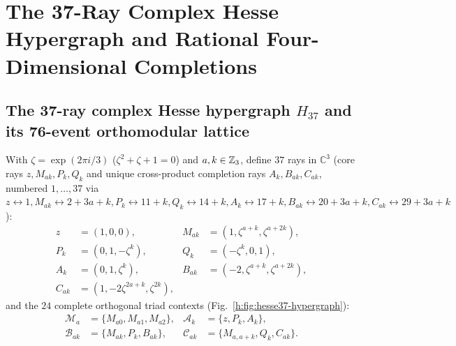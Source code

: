 \documentclass[aps,pra,reprint,superscriptaddress,longbibliography,nofootinbib,floatfix,10pt]{revtex4-2}
\theoremstyle{definition}\newtheorem{definition}[theorem]{Definition}
\theoremstyle{remark}\newtheorem{remark}[theorem]{Remark}
\newcommand{\C}{\mathbb C}\newcommand{\R}{\mathbb R}\newcommand{\Q}{\mathbb Q}
\begin{document}
\section{The 37-Ray Complex Hesse Hypergraph and Rational Four-Dimensional Completions}\label{sec:hesse}\label{sec:four-dimensional}

\subsection{The 37-ray complex Hesse hypergraph \texorpdfstring{$H_{37}$}{H37} and its 76-event orthomodular lattice}

With $\zeta=\exp(2\pi i/3)$ ($\zeta^2+\zeta+1=0$) and $a,k\in\mathbb Z_3$, define $37$ rays in $\C^3$ (core rays $z,M_{ak},P_k,Q_k$ and unique cross-product completion rays $A_k,B_{ak},C_{ak}$, numbered $1,\ldots,37$ via $z\leftrightarrow 1, M_{ak}\leftrightarrow 2+3a+k, P_k\leftrightarrow 11+k, Q_k\leftrightarrow 14+k, A_k\leftrightarrow 17+k, B_{ak}\leftrightarrow 20+3a+k, C_{ak}\leftrightarrow 29+3a+k$):
\begin{equation}\label{h:eq:ray-families}
\begin{aligned}
z&=(1,0,0),& M_{ak}&=(1,\zeta^{a+k},\zeta^{a+2k}),\\
P_k&=(0,1,-\zeta^k),& Q_k&=(-\zeta^k,0,1),\\
A_k&=(0,1,\zeta^k),& B_{ak}&=(-2,\zeta^{a+k},\zeta^{a+2k}),\\
C_{ak}&=(1,-2\zeta^{2a+k},\zeta^{2k}),&&
\end{aligned}
\end{equation}
and the $24$ complete orthogonal triad contexts (Fig.~\ref{h:fig:hesse37-hypergraph}):
\begin{equation}\label{h:eq:contexts-M}
\begin{aligned}
\mathcal M_a&=\{M_{a0},M_{a1},M_{a2}\},& \mathcal A_k&=\{z,P_k,A_k\},\\
\mathcal B_{ak}&=\{M_{ak},P_k,B_{ak}\},& \mathcal C_{ak}&=\{M_{a,a+k},Q_k,C_{ak}\}.
\end{aligned}
\end{equation}
\end{document}
